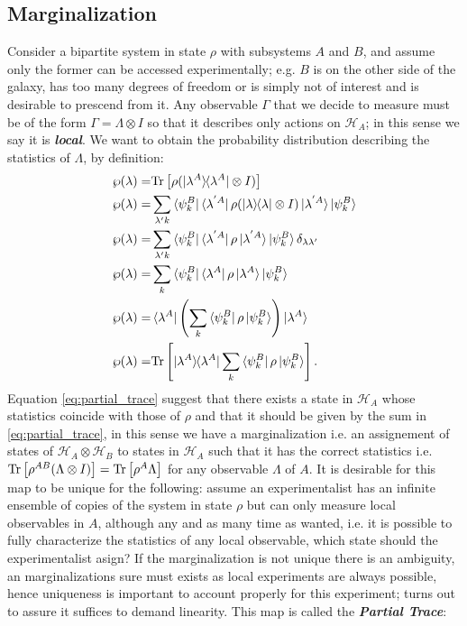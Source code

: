 \subsection{Marginalization}
Consider a bipartite system in state $\rho$ with subsystems $A$ and $B$, and assume only the former can be accessed
experimentally; e.g. $B$ is on the other side of the galaxy, has too many degrees of freedom or is simply not of interest and is desirable
to prescend from it. Any
observable $\Gamma$ that we decide to measure must be of the form $\Gamma=\Lambda \otimes I$ so that it describes only actions on
$\mathcal{H}_{A}$; in this sense we say it is \textit{\textbf{local}}. We want to obtain the probability distribution describing the statistics
of $\Lambda$, by definition:
 \begin{align}
   \wp(\lambda)=&\Tr{\rho (\ketbra{\lambda^{A}}\otimes I)}\\
   \wp(\lambda)=& \sum_{\lambda'k}\bra{\psi_{k}^{B}}\bra{\lambda^{'A}}\rho (\ketbra{\lambda}\otimes I)\ket{\lambda^{'A}}\ket{\psi_{k}^{B}}\\
    \wp(\lambda)=& \sum_{\lambda'k}\bra{\psi_{k}^{B}}\bra{\lambda^{'A}}\rho \ket{\lambda^{'A}}\ket{\psi_{k}^{B}} \delta_{\lambda\lambda'}\\
    \wp(\lambda)=& \sum_{k}\bra{\psi_{k}^{B}}\bra{\lambda^{A}}\rho \ket{\lambda^{A}}\ket{\psi_{k}^{B}} \\
    \wp(\lambda)=& \bra{\lambda^{A}} \left(\sum_{k}\bra{\psi_{k}^{B}}\rho\ket{\psi_{k}^{B}}\right)\ket{\lambda^{A}}\\
    \wp(\lambda)=& \Tr{\ketbra{\lambda^{A}}\sum_{k}\bra{\psi_{k}^{B}}\rho\ket{\psi_{k}^{B}}} \label{eq:partial_trace}.
 \end{align}
Equation \eqref{eq:partial_trace} suggest that there exists a state in $\mathcal{H}_{A}$ whose statistics  coincide
with those of $\rho$ and that it should be given by the sum in \eqref{eq:partial_trace}, in this sense we have a marginalization i.e.
an assignement of states of $\mathcal{H}_{A}\otimes\mathcal{H}_{B}$ to states in $\mathcal{H}_{A}$ such that it has the correct statistics
i.e. $\mathrm{Tr}\left[\rho^{AB}(\Lambda \otimes I)\right]=\mathrm{Tr}\left[\rho^{A}\Lambda\right]$ for any observable $\Lambda$ of $A$. It is desirable for this map to be unique
for the following: assume an experimentalist has an infinite ensemble of copies of the system in state $\rho$ but can only measure local
observables in $A$, although any and as many time as wanted, i.e. it is possible to fully characterize the statistics of any local observable,
which state should the experimentalist asign? If the marginalization is not unique there is an ambiguity, an marginalizations sure must
exists as local experiments are always possible, hence uniqueness is important to account properly for this experiment; turns out to
assure it suffices to demand linearity. This map is called the \textit{\textbf{Partial Trace}}:

